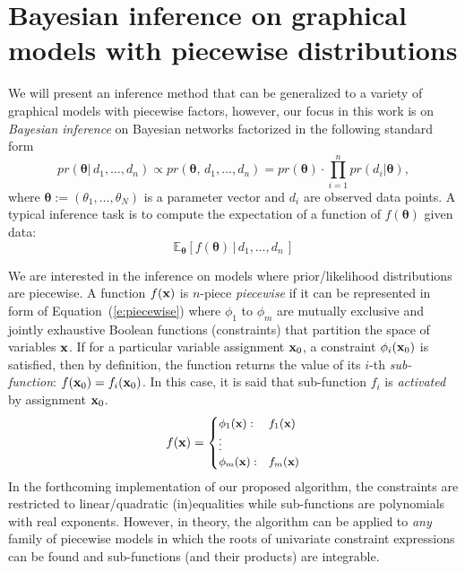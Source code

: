 \section{Bayesian inference on graphical models with piecewise distributions}
\label{sec:inference_piecewise_models}
 We will present an inference method that can be generalized to  
a variety of graphical models with piecewise factors, however, our focus in this
work is on \emph{Bayesian inference} on Bayesian networks factorized in the following
standard form 
\begin{equation}
\label{e:posterior}
pr(\boldsymbol\theta | \, d_1, \ldots, d_n) 
\propto
pr(\boldsymbol\theta, \, d_1, \ldots, d_n) 
= pr(\boldsymbol\theta) \cdot \prod_{i=1}^{n} pr(d_i | \boldsymbol\theta) , 
\end{equation} 
where $\boldsymbol\theta := (\theta_1, \ldots, \theta_N)$ is a parameter vector and $d_i$ are observed data points. 
A typical inference task %
is to compute the expectation of a function of $f(\boldsymbol\theta)$ given data:
\begin{equation}
\label{e:prob.outcome}
\mathbb{E}_{\boldsymbol\theta}[f(\boldsymbol\theta) \,|\, d_1, \ldots, d_n \,]
\end{equation}


We are interested in the inference on models where prior/likelihood distributions are piecewise.
A function $f(\textbf{x})$ is $n$-piece \emph{piecewise} if it can be represented in form of Equation~(\ref{e:piecewise}) where $\phi_1$ to $\phi_m$ are mutually exclusive and jointly exhaustive Boolean functions (constraints) 
that partition the space of variables $\textbf{x}$. If for a particular variable assignment $\textbf{x}_0$, a constraint $\phi_i(\textbf{x}_0)$ is satisfied, then by definition, the function returns the value of its $i$-th \emph{sub-function}: $f(\textbf{x}_0) = f_i(\textbf{x}_0)$.  
In this case, it is said that sub-function $f_i$ is \emph{activated} by assignment $\textbf{x}_0$.
\begin{equation}
\label{e:piecewise}
f(\bvec{x}) = 
{\footnotesize
\begin{cases}
\phi_1(\bvec{x}) : & f_1(\bvec{x})\\
\vdots\\
\phi_m(\bvec{x}) : & f_m(\bvec{x})
\end{cases}
}%
\end{equation}
In the forthcoming implementation of our proposed algorithm, the constraints are restricted to linear/quadratic (in)equalities while sub-functions are polynomials with real exponents.%
  However, in theory, the algorithm can be applied to \emph{any} family of piecewise models in which the roots of univariate constraint expressions can be found and sub-functions (and their products) are integrable. 

